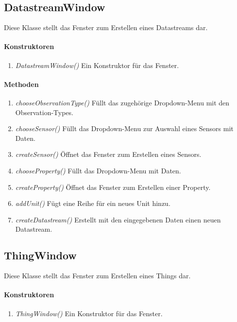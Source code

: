\subsection{DatastreamWindow}
Diese Klasse stellt das Fenster zum Erstellen eines Datastreams dar.

\paragraph{Konstruktoren}
\begin{enumerate}[+]
	\item \textit{DatastreamWindow()} Ein Konstruktor für das Fenster.
\end{enumerate}

\paragraph{Methoden}

\begin{enumerate}[+]
	\item \textit{chooseObservationType()} Füllt das zugehörige Dropdown-Menu mit den Observation-Types.
	\item \textit{chooseSensor()} Füllt das Dropdown-Menu zur Auswahl eines Sensors mit Daten.
	\item \textit{createSensor()} Öffnet das Fenster zum Erstellen eines Sensors.
	\item \textit{chooseProperty()} Füllt das Dropdown-Menu mit Daten.
	\item \textit{createProperty()} Öffnet das Fenster zum Erstellen einer Property.
	\item \textit{addUnit()} Fügt eine Reihe für ein neues Unit hinzu.
	\item \textit{createDatastream()} Erstellt mit den eingegebenen Daten einen neuen Datastream.
\end{enumerate}



\subsection{ThingWindow}
Diese Klasse stellt das Fenster zum Erstellen eines Things dar.

\paragraph{Konstruktoren}
\begin{enumerate}[+]
	\item \textit{ThingWindow()} Ein Konstruktor für das Fenster.
\end{enumerate}

